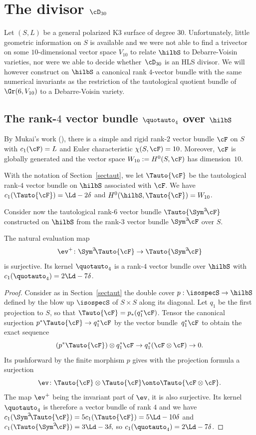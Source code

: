 \section{The divisor \texorpdfstring{$\cD_{30}$}{D30}}\label{ch8}

Let $(S,L)$ be a general polarized K3 surface of degree $30$. Unfortunately, little geometric information on $S$ is available and we
were not able to find a trivector on some $10$-dimensional vector space
$V_{10}$ to relate $\hilbS$ to Debarre-Voisin varieties, nor were we able to decide whether~$\cD_{30}$ is an HLS divisor. We will however construct on $\hilbS$ a canonical rank $4$-vector bundle with the same numerical invariants as the restriction of the
tautological quotient bundle of $\Gr(6,V_{10})$ to a Debarre-Voisin variety.

\subsection{The rank-$4$ vector bundle $\quotauto_4$ over $\hilbS$}\label{g16Q4}
By Mukai's work (\cite{mukai2}), there is a simple and rigid \mbox{rank-$2$} vector bundle $\cF$ on $S$ with $c_1(\cF)=L$ and
Euler characteristic $\chi(S,\cF)=10$. Moreover, $\cF$ is globally generated and the vector space
$W_{10}:=H^0(S,\cF)$ has dimension~$10$.

With the notation of Section~\ref{sectaut}, we let $\Tauto{\cF}$ be the tautological rank-$4$ vector bundle on $\hilbS$
associated with $\cF$.
We have $c_1(\Tauto{\cF})=\Ld-2\delta$ and $H^0(\hilbS,\Tauto{\cF})=W_{10}$.

Consider now the tautological rank-$6$ vector bundle $\Tauto{\Sym^2\! \cF}$ constructed
on $\hilbS$ from the rank-$3$ vector bundle $\Sym^2\! \cF$ over $S$.

\begin{lemm}\label{defE4}
The natural evaluation map\vspace*{-3pt}
\[
\ev^+\colon \Sym^2\! \Tauto{\cF} \to \Tauto{\Sym^2\!\cF}\vspace*{-3pt}
\]
is surjective. Its kernel $\quotauto_4$ is a rank-$4$ vector bundle over $\hilbS$
with $c_1(\quotauto_4) = 2\Ld-7\delta$.
\end{lemm}

\begin{proof}
Consider as in Section~\ref{sectaut} the double cover $p:\isospecS \to \hilbS $
defined by the blow up $\isospecS$ of $S\times S$ along its diagonal. Let $q_1$
be the first projection to $S$, so that $\Tauto{\cF}=p_*(q_1^*\cF)$. Tensor the canonical surjection $p^*\Tauto{\cF} \to q_1^* \cF$ by the vector bundle~$q_1^* \cF$ to obtain the exact sequence
\[
(p^*\Tauto{\cF}) \otimes q_1^* \cF \to q_1^* (\cF \otimes \cF) \to 0.
\]
Its pushforward by the finite morphism $p$ gives with the projection
formula a surjection
\[
\ev\colon \Tauto{\cF} \otimes \Tauto{\cF} \onto \Tauto{\cF \otimes \cF}.
\]
The map $\ev^+$ being the invariant part of $\ev$, it is also
surjective. Its kernel $\quotauto_4$ is therefore a vector bundle of rank $4$ and
we have
$c_1(\Sym^2\! \Tauto{\cF} )=5c_1 (\Tauto{\cF})=5\Ld-10\delta$
and $c_1(\Tauto{\Sym^2\!\cF})=3\Ld-3\delta,$
so $c_1(\quotauto_4)=2\Ld-7\delta$.
\end{proof}

